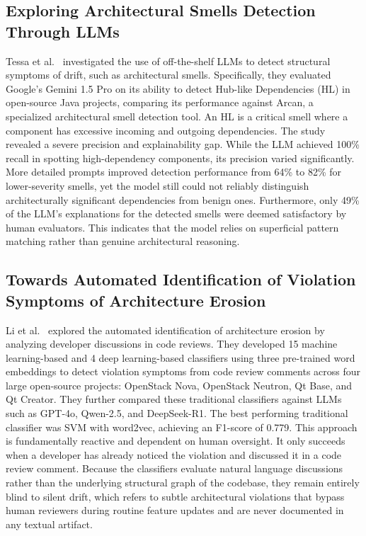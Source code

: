 \documentclass[sigconf,screen]{acmart}
\begin{document}
\subsection{Exploring Architectural Smells Detection Through LLMs}
Tessa et al.~\cite{tessa2025} investigated the use of off-the-shelf LLMs to detect structural symptoms of drift, such as architectural smells. Specifically, they evaluated Google's Gemini 1.5 Pro on its ability to detect Hub-like Dependencies (HL) in open-source Java projects, comparing its performance against Arcan, a specialized architectural smell detection tool. An HL is a critical smell where a component has excessive incoming and outgoing dependencies.
The study revealed a severe precision and explainability gap. While the LLM achieved 100\% recall in spotting high-dependency components, its precision varied significantly. More detailed prompts improved detection performance from 64\% to 82\% for lower-severity smells, yet the model still could not reliably distinguish architecturally significant dependencies from benign ones. Furthermore, only 49\% of the LLM's explanations for the detected smells were deemed satisfactory by human evaluators. This indicates that the model relies on superficial pattern matching rather than genuine architectural reasoning.

\subsection{Towards Automated Identification of Violation Symptoms of Architecture Erosion}
Li et al.~\cite{li2023} explored the automated identification of architecture erosion by analyzing developer discussions in code reviews. They developed 15 machine learning-based and 4 deep learning-based classifiers using three pre-trained word embeddings to detect violation symptoms from code review comments across four large open-source projects: OpenStack Nova, OpenStack Neutron, Qt Base, and Qt Creator. They further compared these traditional classifiers against LLMs such as GPT-4o, Qwen-2.5, and DeepSeek-R1. The best performing traditional classifier was SVM with word2vec, achieving an F1-score of 0.779.
This approach is fundamentally reactive and dependent on human oversight. It only succeeds when a developer has already noticed the violation and discussed it in a code review comment. Because the classifiers evaluate natural language discussions rather than the underlying structural graph of the codebase, they remain entirely blind to silent drift, which refers to subtle architectural violations that bypass human reviewers during routine feature updates and are never documented in any textual artifact.
\end{document}
